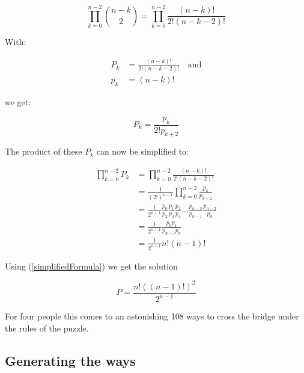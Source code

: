 \begin{equation}
 \prod_{k = 0}^{n - 2} \binom{n - k}{2} =  \prod_{k = 0}^{n - 2} \frac{(n - k) !}{2 ! (n - k - 2)!}
 \label{productPart}
\end{equation}

\noindent With:

\begin{equation}
\begin{aligned}
P_k & = \frac{(n - k) !}{2 ! (n - k - 2)!} \quad \text{and} \\
p_k & = (n - k) ! 
\end{aligned}
\end{equation}

\noindent we get:

\begin{equation}
P_k  = \frac{p_k}{2 ! p_{k + 2}} 
\end{equation}

\noindent The product of these $P_k$ can now be simplified to:

\begin{equation}
\begin{aligned}
 \prod_{k = 0}^{n - 2} P_k & =  \prod_{k = 0}^{n - 2} \frac{(n - k) !}{2 ! (n - k - 2)!} \\
                                              & = \frac{1}{(2!)^{n - 1}} \prod_{k = 0}^{n - 2} \frac{p_k}{p_{k + 2}} \\
                                              & = \frac{1}{2^{n - 1}} \frac{p_0}{p_2} \frac{p_1}{p_3} \frac{p_2}{p_4} \dots \frac{p_{n - 3}}{p_{n - 1}} \frac{p_{n - 2}}{p_n} \\
                                              & = \frac{1}{2^{n - 1}} \frac{p_0 p_1}{p_{n - 1} p_n} \\
                                              & = \frac{1}{2^{n - 1}}  n ! (n - 1) !
\end{aligned}
 \label{simplifiedFormula}
\end{equation}

\noindent Using  (\ref{simplifiedFormula}) we get the solution

\begin{equation}
P = \frac{n ! ((n - 1) !)^2}{2^{n - 1}} 
\end{equation}

For four people this comes to an astonishing 108 ways to cross the bridge under the rules of the puzzle.

\subsection{Generating the ways}

